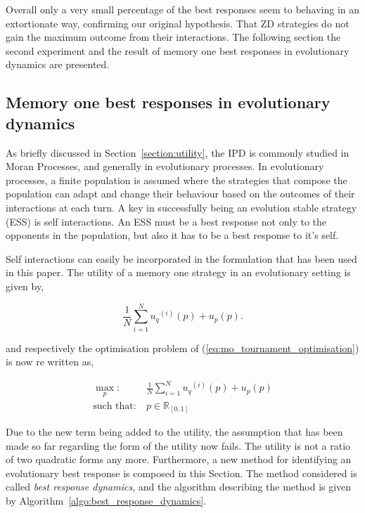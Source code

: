 \documentclass[10pt]{article}
\newcommand{\R}{\mathbb{R}}
\begin{document}
Overall only a very small percentage of the best responses seem to behaving in
an extortionate way, confirming our original hypothesis. That ZD strategies do
not gain the maximum outcome from their interactions. The following section the
second experiment and the result of memory one best responses in evolutionary
dynamics are presented.

\subsection{Memory one best responses in evolutionary dynamics}

As briefly discussed in Section~\ref{section:utility}, the IPD is commonly
studied in Moran Processes, and generally in evolutionary processes. In
evolutionary processes, a finite population is assumed where the strategies that
compose the population can adapt and change their behaviour based on the
outcomes of their interactions at each turn. A key in successfully being an
evolution stable strategy (ESS) is self interactions. An ESS must be a best
response not only to the opponents in the population, but also it has to be a
best response to it's self.

Self interactions can easily be incorporated in the formulation that has been used
in this paper. The utility of a memory one strategy in an evolutionary setting
is given by,

\begin{equation}
    \frac{1}{N} \sum\limits_{i=1} ^ {N} {u_q}^{(i)} (p) + u_p(p).
\end{equation}

and respectively the optimisation problem of (\ref{eq:mo_tournament_optimisation})
is now re written as,

\begin{equation}\label{eq:mo_evolutionary_optimisation}
    \begin{aligned}
    \max_p: & \ \frac{1}{N} \sum\limits_{i=1} ^ {N} {u_q}^{(i)} (p) + u_p(p)
    \\
    \text{such that}: & \ p \in \R_{[0, 1]}
    \end{aligned}
\end{equation}

Due to the new term being added to the utility, the assumption that has been
made so far regarding the form of the utility now fails. The utility is not
a ratio of two quadratic forms any more. Furthermore, a new method for
identifying an evolutionary best response is composed in this Section.
The method considered is called \textit{best response dynamics}, and the algorithm
describing the method is given by Algorithm~\ref{algo:best_response_dynamics}.
\end{document}
